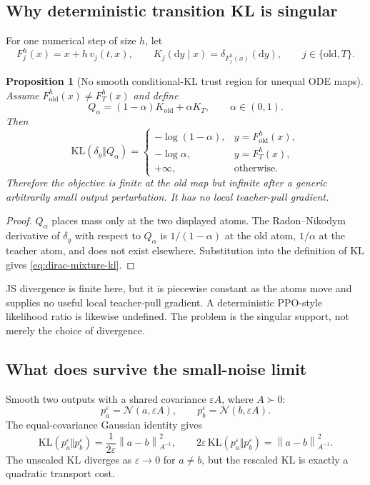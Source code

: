 \documentclass[11pt,a4paper]{article}
\newcommand{\N}{\mathcal{N}}
\newcommand{\KL}{\mathrm{KL}}
\newcommand{\norm}[1]{\left\lVert #1 \right\rVert}
\newcommand{\dd}{\mathrm{d}}
\theoremstyle{plain}
\newtheorem{proposition}[theorem]{Proposition}
\theoremstyle{definition}
\begin{document}
\subsection{Why deterministic transition KL is singular}

For one numerical step of size $h$, let
\begin{equation}
F_j^h(x)=x+h\,v_j(t,x),
\qquad
K_j(\dd y\mid x)=\delta_{F_j^h(x)}(\dd y),
\qquad
j\in\{\mathrm{old},T\}.
\label{eq:deterministic-kernels}
\end{equation}

\begin{proposition}[No smooth conditional-KL trust region for unequal ODE maps]
\label{prop:dirac-kl}
Assume $F_{\mathrm{old}}^h(x)\neq F_T^h(x)$ and define
\[
Q_\alpha=(1-\alpha)K_{\mathrm{old}}+\alpha K_T,
\qquad \alpha\in(0,1).
\]
Then
\begin{equation}
\KL(\delta_y\Vert Q_\alpha)
=
\begin{cases}
-\log(1-\alpha), & y=F_{\mathrm{old}}^h(x),\\
-\log\alpha, & y=F_T^h(x),\\
+\infty, & \text{otherwise}.
\end{cases}
\label{eq:dirac-mixture-kl}
\end{equation}
Therefore the objective is finite at the old map but infinite after a generic arbitrarily small
output perturbation.  It has no local teacher-pull gradient.
\end{proposition}

\begin{proof}
$Q_\alpha$ places mass only at the two displayed atoms.  The Radon--Nikodym derivative of
$\delta_y$ with respect to $Q_\alpha$ is $1/(1-\alpha)$ at the old atom, $1/\alpha$ at the
teacher atom, and does not exist elsewhere.  Substitution into the definition of KL gives
\eqref{eq:dirac-mixture-kl}.
\end{proof}

JS divergence is finite here, but it is piecewise constant as the atoms move and supplies no
useful local teacher-pull gradient.  A deterministic PPO-style likelihood ratio is likewise
undefined.  The problem is the singular support, not merely the choice of divergence.

\subsection{What does survive the small-noise limit}

Smooth two outputs with a shared covariance $\varepsilon A$, where $A\succ0$:
\begin{equation}
p_a^\varepsilon=\N(a,\varepsilon A),
\qquad
p_b^\varepsilon=\N(b,\varepsilon A).
\end{equation}
The equal-covariance Gaussian identity gives
\begin{equation}
\KL(p_a^\varepsilon\Vert p_b^\varepsilon)
  =\frac{1}{2\varepsilon}\norm{a-b}_{A^{-1}}^2,
\qquad
2\varepsilon\,
\KL(p_a^\varepsilon\Vert p_b^\varepsilon)
  =\norm{a-b}_{A^{-1}}^2 .
\label{eq:rescaled-gaussian-kl}
\end{equation}
The unscaled KL diverges as $\varepsilon\to0$ for $a\neq b$, but the rescaled KL is exactly a
quadratic transport cost.
\end{document}
